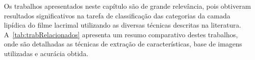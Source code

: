 
Os trabalhos apresentados neste capítulo são de grande relevância, pois obtiveram resultados significativos na tarefa de classificação das categorias da camada lipídica do filme lacrimal utilizando as diversas técnicas descritas na literatura. A~\autoref{tab:trabRelacionados} apresenta um resumo comparativo destes trabalhos, onde são detalhadas as técnicas de extração de características, base de imagens utilizadas e acurácia obtida.

